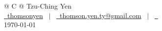 

\def\cvphone{}


\pagestyle{empty}

\begin{tabularx}{\linewidth}{@{} C @{}}
\Huge{Tzu-Ching Yen} \\[7.5pt]
\href{https://linkedin.com/in/thomsonyen}{\raisebox{-0.05\height}\faLinkedin\ thomsonyen} \ $|$ \
\href{mailto:thomson.yen.ty@gmail.com}{\raisebox{-0.05\height}\faEnvelope \ thomson.yen.ty@gmail.com}%
\ifx\cvphone\empty\else \ $|$ \ \href{tel:\cvphone}{\raisebox{-0.05\height}\faMobile \ \cvphone}\fi \\[5pt]
\today \\
\end{tabularx}




